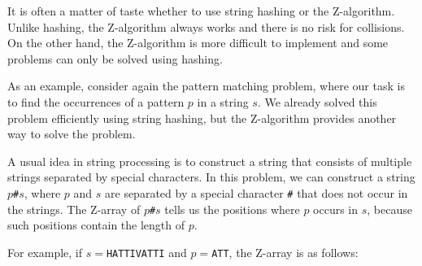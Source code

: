 It is often a matter of taste whether to use
string hashing or the Z-algorithm.
Unlike hashing, the Z-algorithm always works
and there is no risk for collisions.
On the other hand, the Z-algorithm is more difficult
to implement and some problems can only be solved
using hashing.

As an example, consider again
the pattern matching problem,
where our task is to find the occurrences
of a pattern $p$ in a string $s$.
We already solved this problem efficiently
using string hashing, but the Z-algorithm
provides another way to solve the problem.

A usual idea in string processing is to
construct a string that consists of
multiple strings separated by special characters.
In this problem, we can construct a string
$p$\texttt{\#}$s$,
where $p$ and $s$ are separated by a special
character \texttt{\#} that does not occur
in the strings.
The Z-array of $p$\texttt{\#}$s$ tells us the positions
where $p$ occurs in $s$,
because such positions contain the length of $p$.

For example, if $s=$\texttt{HATTIVATTI} and $p=$\texttt{ATT},
the Z-array is as follows:

\begin{center}
\end{center}

